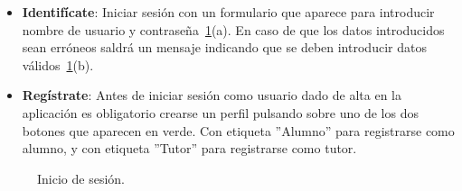 \documentclass[a4paper, 12pt]{book}
\begin{document}
\begin{itemize}
  \item {\bfseries Identif\'icate}: Iniciar sesi\'on con un formulario que aparece para introducir nombre de usuario y contrase\~na~\ref{figura:inicio1}(a).
  En caso de que los datos introducidos sean err\'oneos saldr\'a un mensaje indicando que se deben introducir datos v\'alidos~\ref{figura:inicio1}(b).
  \item {\bfseries Reg\'istrate}: Antes de iniciar sesi\'on como usuario dado de alta en la aplicaci\'on es obligatorio crearse un perfil pulsando sobre 
  uno de los dos botones que aparecen en verde. Con etiqueta ''Alumno'' para registrarse como alumno, y con etiqueta ''Tutor'' para registrarse como tutor.
\end{itemize} 

\begin{figure}[htbp] 
  \centering
  \caption{Inicio de sesi\'on.}
  \label{figura:inicio1}
\end{figure}
\end{document}
